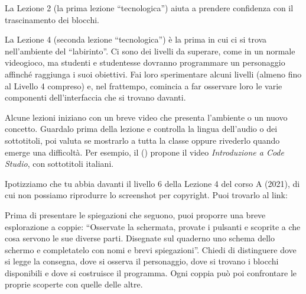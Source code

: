 La Lezione 2 (la prima lezione ``tecnologica'') aiuta a prendere confidenza con il trascinamento dei blocchi.

La Lezione 4 (seconda lezione ``tecnologica'') è la prima in cui ci si trova nell'ambiente del ``labirinto''. Ci sono dei livelli da superare, come in un normale videogioco, ma studenti e studentesse dovranno programmare un personaggio affinché raggiunga i suoi obiettivi. Fai loro sperimentare alcuni livelli (almeno fino al Livello 4 compreso) e, nel frattempo, comincia a far osservare loro le varie componenti dell'interfaccia che si trovano davanti.

Alcune lezioni iniziano con un breve video che presenta l'ambiente o un nuovo concetto. Guardalo prima della lezione e controlla la lingua dell'audio o dei sottotitoli, poi valuta se mostrarlo a tutta la classe oppure rivederlo quando emerge una difficoltà. Per esempio, il  () propone il video \emph{Introduzione a Code Studio}, con sottotitoli italiani.

Ipotizziamo che tu abbia davanti il livello 6 della Lezione 4 del corso A (2021), di cui non possiamo riprodurre lo screenshot per copyright.
Puoi trovarlo al link: 

Prima di presentare le spiegazioni che seguono, puoi proporre una breve esplorazione a coppie: ``Osservate la schermata, provate i pulsanti e scoprite a che cosa servono le sue diverse parti. Disegnate sul quaderno uno schema dello schermo e completatelo con nomi e brevi spiegazioni''. Chiedi di distinguere dove si legge la consegna, dove si osserva il personaggio, dove si trovano i blocchi disponibili e dove si costruisce il programma. Ogni coppia può poi confrontare le proprie scoperte con quelle delle altre.

